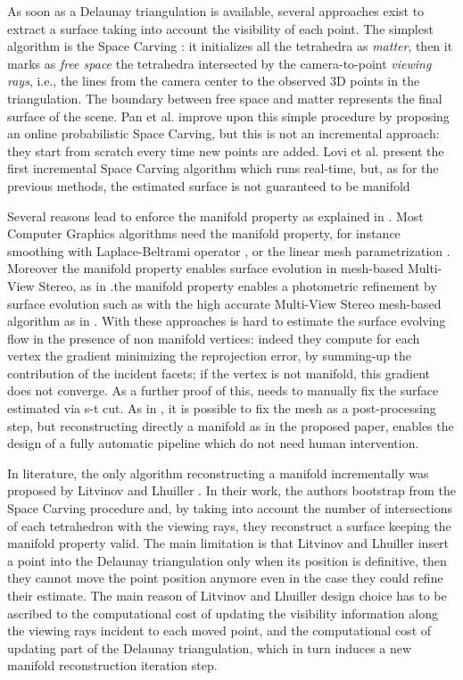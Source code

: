 As soon as a Delaunay triangulation is available, several approaches exist to extract a surface taking into account the visibility of each point. 
The simplest algorithm is the Space Carving \cite{kutulakos_seitz05}: it initializes all the tetrahedra as \emph{matter}, then it marks as \emph{free space} the tetrahedra intersected by the camera-to-point \emph{viewing rays}, i.e., the lines from the camera center to the observed 3D points in the triangulation. 
The boundary between free space and matter represents the final surface of the scene.
Pan et al. \cite{Pan_et_al09} improve upon this simple procedure by proposing an online probabilistic Space Carving, but this is not an incremental approach: they start from scratch every time new points are added.
Lovi et al. \cite{Lovi_et_al_11} present the first incremental Space Carving algorithm which runs real-time, but, as for the previous methods, the estimated surface is not guaranteed to be manifold 

Several reasons lead to enforce the manifold property as explained in \cite{lhuillier20152}. 
Most Computer Graphics algorithms need the manifold property, for instance smoothing with Laplace-Beltrami operator \cite{Meyer03}, or the linear mesh parametrization \cite{saboret00}.
Moreover the manifold property enables surface evolution in mesh-based Multi-View Stereo, as in \cite{vu_et_al_2012,delaunoy_et_al_08}.the manifold property enables a photometric refinement by surface evolution such as with the high accurate Multi-View Stereo mesh-based algorithm as in \cite{vu_et_al_2012,delaunoy_et_al_08}.
With these approaches is hard to estimate the surface evolving flow in the presence of non manifold vertices: indeed they compute for each vertex the gradient minimizing the reprojection error, by summing-up the contribution of the incident facets; if the vertex is not manifold, this gradient does not converge. As a further proof of this, \cite{vu_et_al_2012} needs to manually fix the surface estimated via s-t cut.
As in \cite{vu_et_al_2012}, it is possible to fix the mesh as a post-processing step, but reconstructing directly a manifold as in the proposed paper, enables the design of a fully automatic pipeline which do not need human intervention.

In literature, the only algorithm reconstructing a manifold incrementally was proposed by Litvinov and Lhuiller \cite{litvinov_lhuillier_13,litvinov_Lhiuller14}. 
In their work, the authors  bootstrap from the Space Carving procedure and, by taking into account the number of intersections of each tetrahedron with the viewing rays, they reconstruct a surface keeping the manifold property valid. 
The main limitation is that  Litvinov and Lhuiller insert a point into the Delaunay triangulation only when its position is definitive, then they cannot move the point position anymore even in the case they could refine their estimate. 
The main reason of Litvinov and Lhuiller design choice has to be ascribed to the computational cost of updating the visibility information along the viewing rays incident to each moved point, and the computational cost of updating part of the Delaunay triangulation, which in turn induces a new manifold reconstruction iteration step.

